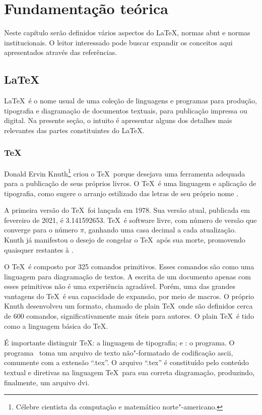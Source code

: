 \chapter{Fundamentação teórica}

Neste capítulo serão definidos vários aspectos do \LaTeX, normas \ac{abnt} e normas institucionais. O leitor interessado pode buscar expandir os conceitos aqui apresentados através das referências.

\section{\LaTeX}

\LaTeX\ é o nome usual de uma coleção de linguagens e programas para produção, tipografia e diagramação de documentos textuais, para publicação impressa ou digital. Na presente seção, o intuito é apresentar alguns dos detalhes mais relevantes das partes constituintes do \LaTeX.

\subsection{\TeX}

Donald Ervin Knuth\footnote{Célebre cientista da computação e matemático norte"-americano.} criou o \TeX\ porque desejava uma ferramenta adequada para a publicação de seus próprios livros. O \TeX\ é uma linguagem e aplicação de tipografia, como sugere o arranjo estilizado das letras de seu próprio nome \cites{Knuth1986a,Knuth1986b,Knuth1986c,Knuth1986d,Knuth1986e}.

A primeira versão do \TeX\ foi lançada em 1978. Sua versão atual, publicada em fevereiro de 2021, é 3.141592653. \TeX\ é software livre, com número de versão que converge para o número \(\pi\), ganhando uma casa decimal a cada atualização. Knuth já manifestou o desejo de congelar o \TeX\ após sua morte, promovendo quaisquer  restantes à .

O \TeX\ é composto por 325 comandos primitivos. Esses comandos são como uma linguagem  para diagramação de textos. A escrita de um documento apenas com esses primitivos não é uma experiência agradável. Porém, uma das grandes vantagens do \TeX\ é sua capacidade de expansão, por meio de macros. O próprio Knuth desenvolveu um formato, chamado de plain \TeX\, onde são definidos cerca de 600 comandos, significativamente mais úteis para autores. O plain \TeX\ é tido como a linguagem básica do \TeX.

É importante distinguir \TeX: a linguagem de tipografia; e \tex: o programa. O programa \tex\ toma um arquivo de texto não"-formatado de codificação \ac{ascii}, comumente com a extensão \enquote{.tex}. O arquivo \enquote{.tex} é constituído pelo conteúdo textual e diretivas na linguagem \TeX\ para sua correta diagramação, produzindo, finalmente, um arquivo \ac{dvi}.

